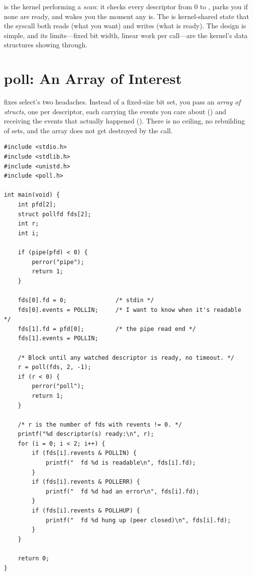 \begin{osconcept}
 is the kernel performing a \emph{scan}: it checks every
descriptor from 0 to , parks you if none are ready, and
wakes you the moment any is. The  is kernel-shared
state that the syscall both reads (what you want) and writes (what is
ready). The design is simple, and its limits---fixed bit width, linear
work per call---are the kernel's data structures showing through.
\end{osconcept}

\section{poll: An Array of Interest}

 fixes select's two headaches. Instead of a fixed-size bit
set, you pass an \emph{array of structs}, one per descriptor, each
carrying the events you care about () and receiving the
events that actually happened (). There is no
 ceiling, no rebuilding of sets, and the array does
not get destroyed by the call.

\begin{lstlisting}[caption={poll: an array of descriptors and interests.}]
#include <stdio.h>
#include <stdlib.h>
#include <unistd.h>
#include <poll.h>

int main(void) {
    int pfd[2];
    struct pollfd fds[2];
    int r;
    int i;

    if (pipe(pfd) < 0) {
        perror("pipe");
        return 1;
    }

    fds[0].fd = 0;              /* stdin */
    fds[0].events = POLLIN;     /* I want to know when it's readable */
    fds[1].fd = pfd[0];         /* the pipe read end */
    fds[1].events = POLLIN;

    /* Block until any watched descriptor is ready, no timeout. */
    r = poll(fds, 2, -1);
    if (r < 0) {
        perror("poll");
        return 1;
    }

    /* r is the number of fds with revents != 0. */
    printf("%d descriptor(s) ready:\n", r);
    for (i = 0; i < 2; i++) {
        if (fds[i].revents & POLLIN) {
            printf("  fd %d is readable\n", fds[i].fd);
        }
        if (fds[i].revents & POLLERR) {
            printf("  fd %d had an error\n", fds[i].fd);
        }
        if (fds[i].revents & POLLHUP) {
            printf("  fd %d hung up (peer closed)\n", fds[i].fd);
        }
    }

    return 0;
}
\end{lstlisting}

